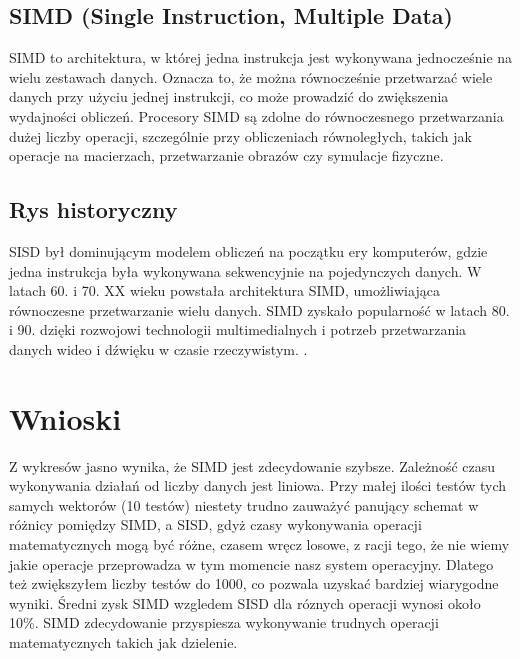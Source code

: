 \documentclass[11pt]{article}
\begin{document}
\subsection{SIMD (Single Instruction, Multiple Data)}
SIMD to architektura, w której jedna instrukcja jest wykonywana jednocześnie na wielu zestawach danych. Oznacza to, że można równocześnie przetwarzać wiele danych przy użyciu jednej instrukcji, co może prowadzić do zwiększenia wydajności obliczeń. Procesory SIMD są zdolne do równoczesnego przetwarzania dużej liczby operacji, szczególnie przy obliczeniach równoległych, takich jak operacje na macierzach, przetwarzanie obrazów czy symulacje fizyczne.
\subsection{Rys historyczny}
SISD był dominującym modelem obliczeń na początku ery komputerów, gdzie jedna instrukcja była wykonywana sekwencyjnie na pojedynczych danych. W latach 60. i 70. XX wieku powstała architektura SIMD, umożliwiająca równoczesne przetwarzanie wielu danych. SIMD zyskało popularność w latach 80. i 90. dzięki rozwojowi technologii multimedialnych i  potrzeb przetwarzania danych wideo i dźwięku w czasie rzeczywistym. .
\section{Wnioski}
Z wykresów jasno wynika, że SIMD jest zdecydowanie szybsze. Zależność czasu wykonywania działań od liczby danych jest liniowa. Przy małej ilości testów tych samych wektorów (10 testów) niestety trudno zauważyć panujący schemat w różnicy pomiędzy SIMD, a SISD, gdyż czasy wykonywania operacji matematycznych mogą być różne, czasem wręcz losowe, z racji tego, że nie wiemy jakie operacje przeprowadza w tym momencie nasz system operacyjny. Dlatego też zwiększyłem liczby testów do 1000, co pozwala uzyskać bardziej wiarygodne wyniki.
Średni zysk SIMD wzgledem SISD dla róznych operacji wynosi około 10\%. SIMD zdecydowanie przyspiesza wykonywanie trudnych operacji matematycznych takich jak dzielenie.
\end{document}
